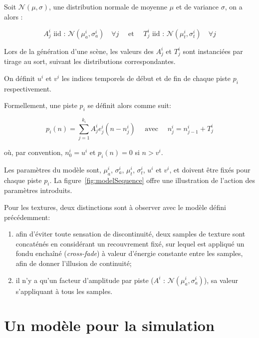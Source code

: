 Soit $\mathcal{N}(\mu,\sigma)$, une distribution normale de moyenne $\mu$ et de variance $\sigma$, on a alors :   

\begin{equation}
\label{eq:ch4_eq1}
A_j^i \textrm{ iid : } \mathcal{N}(\mu_a^{i},\sigma_a^{i}) \quad \forall j \quad \textrm{ et } \quad T_j^i \textrm{ iid : } \mathcal{N}({\mu_t^{i},\sigma_t^{i}}) \quad \forall j
\end{equation}

Lors de la génération d'une scène, les valeurs des $A^i_j$ et $T_j^i$ sont instanciées par tirage au sort, suivant les distributions correspondantes.

On définit $u^i$ et $v^i$ les indices temporels de début et de fin de chaque piste $p_i$ respectivement. 

Formellement, une piste $p_i$ se définit alors comme suit:
 
\begin{equation}
\label{eq:ch4_eq2}
p_{i}(n)= \sum_{j=1}^{k_i} A_j^i e_j^i(n-n_j^i) \quad \textrm{ avec } \quad n_j^i=n_{j-1}^i + T_j^i
\end{equation}

où, par convention, $n^i_0=u^i$ et $p_i(n)=0$ si $n>v^i$. 

Les paramètres du modèle sont, $\mu_a^i$, $\sigma_a^i$, $\mu_t^i$, $\sigma_t^i$, $u^i$ et $v^i$, et doivent être fixés pour chaque piste $p_i$. La figure~\ref{fig:modelSequence} offre une illustration de l'action des paramètres introduits.

Pour les textures, deux distinctions sont à observer avec le modèle défini précédemment: 

\begin{enumerate}
\item afin d'éviter toute sensation de discontinuité, deux samples de texture sont concaténés en considérant un recouvrement fixé, sur lequel est appliqué un fondu enchaîné (\emph{cross-fade}) à valeur d'énergie constante entre les samples, afin de donner l'illusion de continuité;
\item il n'y a qu'un facteur d'amplitude par piste ($A^i \textrm{ : } \mathcal{N}(\mu_a^{i},\sigma_a^{i})$), sa valeur s'appliquant à tous les samples.
\end{enumerate}

\section{Un modèle pour la simulation}
\label{sec:ch4_modAnaSo}

